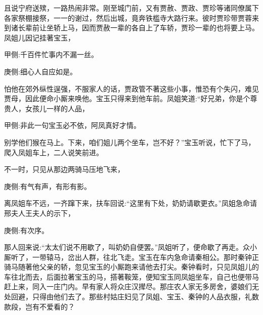 \begin{parag}
    且说宁府送殡，一路热闹非常。刚至城门前，又有贾赦、贾政、贾珍等诸同僚属下各家祭棚接祭，一一的谢过，然后出城，竟奔铁槛寺大路行来。彼时贾珍带贾蓉来到诸长辈前让坐轿上马，因而贾赦一辈的各自上了车轿，贾珍一辈的也将要上马。凤姐儿因记挂著宝玉，\begin{note}甲侧:千百件忙事内不漏一丝。\end{note}\begin{note}庚侧:细心人自应如是。\end{note}怕他在郊外纵性逞强，不服家人的话，贾政管不著这些小事，惟恐有个失闪，难见贾母，因此便命小厮来唤他。宝玉只得来到他车前。凤姐笑道:“好兄弟，你是个尊贵人，女孩儿一样的人品，\begin{note}甲侧:非此一句宝玉必不依，阿凤真好才情。\end{note}别学他们猴在马上。下来，咱们姐儿两个坐车，岂不好？”宝玉听说，忙下了马，爬入凤姐车上，二人说笑前进。
\end{parag}


\begin{parag}
    不一时，只见从那边两骑马压地飞来，\begin{note}庚侧:有气有声，有形有影。\end{note}离凤姐车不远，一齐蹿下来，扶车回说:“这里有下处，奶奶请歇更衣。”凤姐急命请邢夫人王夫人的示下，\begin{note}庚侧:有次序。\end{note}那人回来说:“太太们说不用歇了，叫奶奶自便罢。”凤姐听了，便命歇了再走。众小厮听了，一带辕马，岔出人群，往北飞走。宝玉在车内急命请秦相公。那时秦钟正骑马随著他父亲的轿，忽见宝玉的小厮跑来请他去打尖。秦钟看时，只见凤姐儿的车往北而去，后面拉著宝玉的马，搭著鞍笼，便知宝玉同凤姐坐车，自己也便带马赶上来，同入一庄门内。早有家人将众庄汉撵尽。那庄农人家无多房舍，婆娘们无处回避，只得由他们去了。那些村姑庄妇见了凤姐、宝玉、秦钟的人品衣服，礼数款段，岂有不爱看的？
\end{parag}


